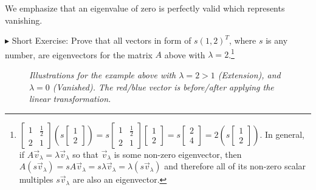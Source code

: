 We emphasize that an eigenvalue of zero is perfectly valid which represents vanishing. \par
$\blacktriangleright$ Short Exercise: Prove that all vectors in form of $s(1,2)^T$, where $s$ is any number, are eigenvectors for the matrix $A$ above with $\lambda = 2$.\footnote{
$
\begin{bmatrix}
1 & \frac{1}{2} \\
2 & 1
\end{bmatrix}
\left(s
\begin{bmatrix}
1 \\
2 
\end{bmatrix}\right)
=
s\begin{bmatrix}
1 & \frac{1}{2} \\
2 & 1
\end{bmatrix}
\begin{bmatrix}
1 \\
2 
\end{bmatrix}
=
s
\begin{bmatrix}
2 \\
4
\end{bmatrix}
=
2\left(s
\begin{bmatrix}
1 \\
2 
\end{bmatrix}\right)
$. In general, if $A\vec{v}_\lambda = \lambda\vec{v}_\lambda$ so that $\vec{v}_\lambda$ is some non-zero eigenvector, then $A(s\vec{v}_\lambda) = sA\vec{v}_\lambda = s\lambda\vec{v}_\lambda = \lambda(s\vec{v}_\lambda)$ and therefore all of its non-zero scalar multiples $s\vec{v}_\lambda$ are also an eigenvector.}\par
\begin{figure}[h!]
\centering
{}
\caption{\textit{Illustrations for the example above with $\lambda = 2 > 1$ (Extension), and $\lambda = 0$ (Vanished). The red/blue vector is before/after applying the linear transformation.}}
\end{figure}
